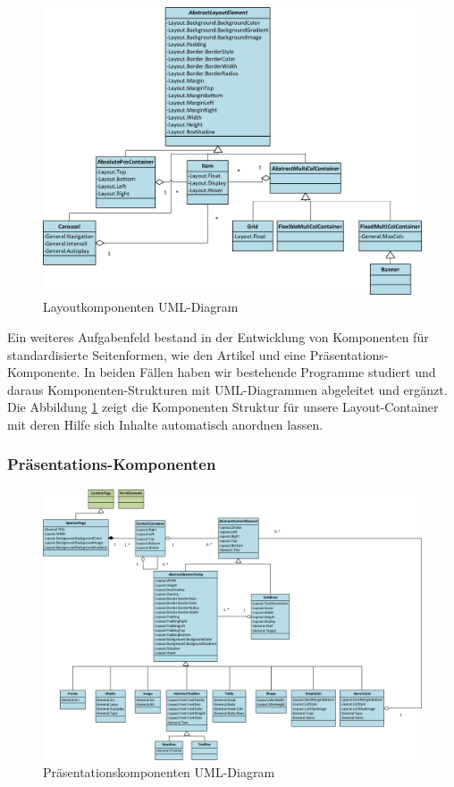 \documentclass[12pt]{article}
\begin{document}
\begin{figure}[h]
	\centering
	\includegraphics[width=1.0\textwidth]{Layout.png}
	\caption{Layoutkomponenten UML-Diagram}
	\label{fig:Layout}
\end{figure}

Ein weiteres Aufgabenfeld bestand in der Entwicklung von Komponenten für standardisierte Seitenformen, wie den Artikel und
eine Präsentations-Komponente. In beiden Fällen haben wir bestehende Programme studiert und daraus Komponenten-Strukturen
mit UML-Diagrammen abgeleitet und ergänzt. Die Abbildung \ref{fig:Layout} zeigt die Komponenten Struktur für unsere Layout-Container mit deren
Hilfe sich Inhalte automatisch anordnen lassen.

\subsubsection{Präsentations-Komponenten}

\begin{figure}[h]
	\centering
	\includegraphics[width=1.0\textwidth]{Beamer.png}
	\caption{Präsentationskomponenten UML-Diagram}
	\label{fig:Beamer}
\end{figure}
\end{document}
